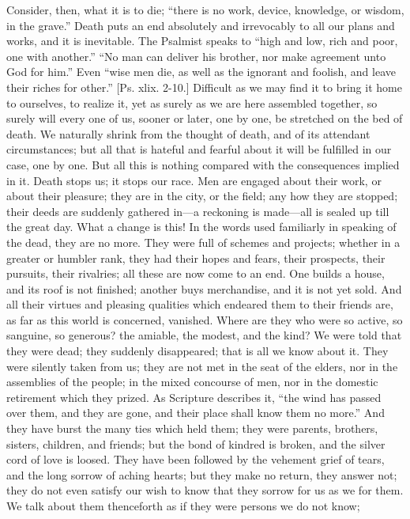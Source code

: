 Consider, then, what it is to die; ``there is no work, device,
knowledge, or wisdom, in the grave.'' Death puts an end absolutely
and irrevocably to all our plans and works, and it is inevitable. The
Psalmist speaks to ``high and low, rich and poor, one with
another.'' ``No man can deliver his brother, nor make
agreement unto God for him.'' Even ``wise men die, as well as
the ignorant and foolish, and leave their riches for other.'' [Ps.
xlix. 2-10.] Difficult as we may find it to bring it home to
ourselves, to realize it, yet as surely as we are here assembled
together, so surely will every one of us, sooner or later, one by one,
be stretched on the bed of death. We naturally shrink from the thought
of death, and of its attendant circumstances; but all that is hateful
and fearful about it will be fulfilled in our case, one by one. But
all this is nothing compared with the consequences implied in it.
Death stops us; it stops our race. Men are engaged about their work,
or about their pleasure; they are in the city, or the field; any how
they are stopped; their deeds are suddenly gathered in—a reckoning
is made—all is sealed up till the great day. What a change is this!
In the words used familiarly in speaking of the dead, they are no
more. They were full of schemes and projects; whether in a greater or
humbler rank, they had their hopes and fears, their prospects, their
pursuits, their rivalries; all these are now come to an end. One
builds a house, and its roof is not finished; another buys
merchandise, and it is not yet sold. And all their virtues and
pleasing qualities which endeared them to their friends are, as far as
this world is concerned, vanished. Where are they who were so active,
so sanguine, so generous? the amiable, the modest, and the kind? We
were told that they were dead; they suddenly disappeared; that is all
we know about it. They were silently taken from us; they are not met
in the seat of the elders, nor in the assemblies of the people; in the
mixed concourse of men, nor in the domestic retirement which they
prized. As Scripture describes it, ``the wind has passed over
them, and they are gone, and their place shall know them no
more.'' And they have burst the many ties which held them; they
were parents, brothers, sisters, children, and friends; but the bond
of kindred is broken, and the silver cord of love is loosed. They have
been followed by the vehement grief of tears, and the long sorrow of
aching hearts; but they make no return, they answer not; they do not
even satisfy our wish to know that they sorrow for us as we for them.
We talk about them thenceforth as if they were persons we do not know;
